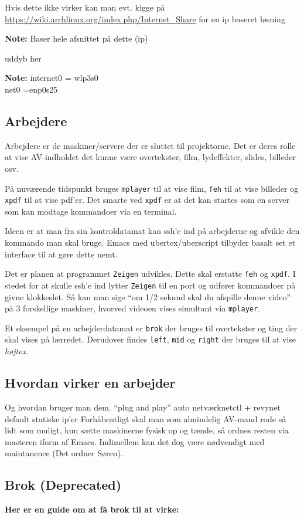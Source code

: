 \documentclass[10pt,a4paper,danish]{article}
\newcommand{\note}[1]{\begin{mdframed}[style=note]\textbf{Note:}
    #1\end{mdframed}}
\begin{document}
Hvis dette ikke virker kan man evt. kigge på
\url{https://wiki.archlinux.org/index.php/Internet_Share} for en ip baseret løsning
\note{Baser hele afsnittet på dette (ip)

  uddyb her}

\note{internet0 = wlp3s0\\net0 =enp0s25}
\subsection{Arbejdere}
Arbejdere er de maskiner/servere der er sluttet til projektorne. Det er deres
rolle at vise AV-indholdet det kunne være overtekster, film, lydeffekter,
slides, billeder osv.

På nuværende tidspunkt bruges \texttt{mplayer} til at vise film, \texttt{feh}
til at vise billeder og \texttt{xpdf} til at vise pdf'er.
Det smarte ved \texttt{xpdf} er at det kan startes som en server som kan modtage
kommandoer via en terminal.

Ideen er at man fra sin kontroldatamat kan ssh'e ind på arbejderne og afvikle
den kommando man skal bruge. Emacs med ubertex/uberscript tilbyder basalt set et
interface til at gøre dette nemt.

Det er planen at programmet \texttt{Zeigen} udvikles.
Dette skal erstatte \texttt{feh} og \texttt{xpdf}.
I stedet for at skulle ssh'e ind lytter \texttt{Zeigen} til en port og udfører
kommandoer på givne klokkeslet. Så kan man sige ``om 1/2 sekund skal du afspille
denne video'' på 3 forskellige maskiner, hvorved videoen vises simultant via
\texttt{mplayer}.


Et eksempel på en arbejderdatamat er \texttt{brok} der bruges til overtekster og ting der
skal vises på lærredet.
Derudover findes \texttt{left}, \texttt{mid} og \texttt{right} der bruges til at vise \textit{højtex}.


\subsection{Hvordan virker en arbejder}
Og hvordan bruger man dem.
``plug and play''
auto netværknetctl + revynet
default statiske ip'er
Forhåbentligt skal man som almindelig AV-mand rode så lidt som muligt, kun sætte
maskinerne fysisk op og tænde, så ordnes resten via masteren iform af Emacs.
Indimellem kan det dog være nødvendigt med maintanence (Det ordner Søren).


\subsection{Brok (Deprecated)}
\textbf{Her er en guide om at få brok til at virke:}
\end{document}
